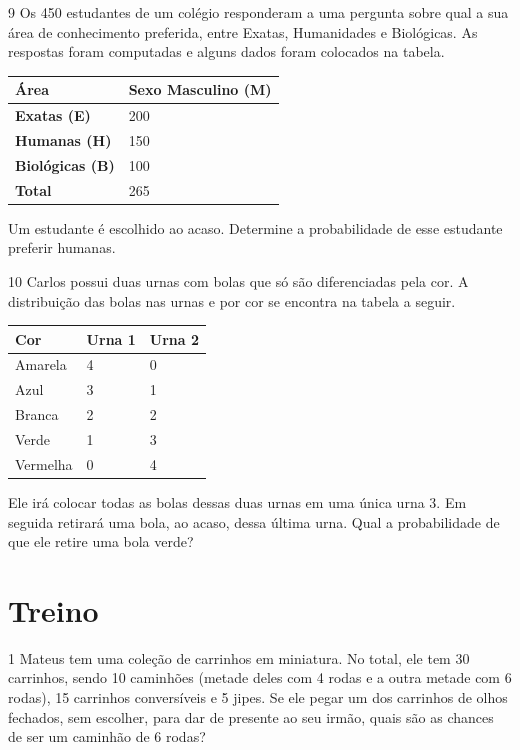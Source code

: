 
\num{9} Os 450 estudantes de um colégio responderam a uma pergunta sobre qual a
sua área de conhecimento preferida, entre Exatas, Humanidades e
Biológicas. As respostas foram computadas e alguns dados foram colocados
na tabela.

\begin{longtable}[]{@{}ll@{}}
\toprule
\hline
\textbf{Área} & \textbf{Sexo Masculino (M)}\tabularnewline
\hline
\textbf{Exatas (E)} & 200\tabularnewline
\hline
\textbf{Humanas (H)} & 150\tabularnewline
\hline
\textbf{Biológicas (B)} & 100\tabularnewline
\hline
\textbf{Total} & 265\tabularnewline
\hline
\bottomrule
\end{longtable}

Um estudante é escolhido ao acaso. Determine a probabilidade de esse
estudante preferir humanas.


\num{10} Carlos possui duas urnas com bolas que só são diferenciadas pela cor. A
distribuição das bolas nas urnas e por cor se encontra na tabela a
seguir.

\begin{longtable}[]{@{}lll@{}}
\toprule
\hline
\textbf{Cor} & \textbf{Urna 1} & \textbf{Urna 2}\tabularnewline
\hline
\midrule
\endhead
Amarela & 4 & 0\tabularnewline
\hline
Azul & 3 & 1\tabularnewline
\hline
Branca & 2 & 2\tabularnewline
\hline
Verde & 1 & 3\tabularnewline
\hline
Vermelha & 0 & 4\tabularnewline
\hline
\bottomrule
\end{longtable}

Ele irá colocar todas as bolas dessas duas urnas em uma única urna 3. Em
seguida retirará uma bola, ao acaso, dessa última urna. Qual a
probabilidade de que ele retire uma bola verde?

\section*{Treino}

\num{1} Mateus tem uma coleção de carrinhos em miniatura. No total, ele tem 30 carrinhos, sendo 10 caminhões (metade deles com 4 rodas e a outra metade com 6 rodas), 15 carrinhos conversíveis e 5 jipes. Se ele pegar um dos carrinhos de olhos fechados, sem escolher, para dar de presente ao seu irmão, quais são as chances de ser um caminhão de 6 rodas?

